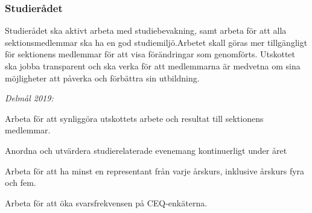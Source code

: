 \documentclass[../_main/handlingar.tex]{subfiles}
\begin{document}
\subsubsection*{Studierådet}
Studierådet ska aktivt arbeta med studiebevakning, samt arbeta för att alla sektionsmedlemmar ska ha en god studiemiljö.Arbetet skall göras mer tillgängligt för sektionens medlemmar för att visa förändringar som genomförts. Utskottet ska jobba transparent och ska verka för att medlemmarna är medvetna  om sina möjligheter att påverka och förbättra sin utbildning.

\emph{Delmål 2019:}
\begin{dashlist}
	\item Arbeta för att synliggöra utskottets arbete och resultat till sektionens medlemmar.
	\item Anordna och utvärdera studierelaterade evenemang kontinuerligt under året
	\item Arbeta för att ha minst en representant från varje årskurs, inklusive årskurs fyra och fem.
	\item Arbeta för att öka svarsfrekvensen på CEQ-enkäterna.
\end{dashlist}

\newpage
\end{document}
